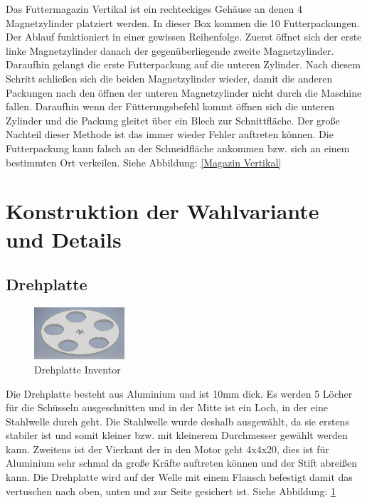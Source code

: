 Das Futtermagazin Vertikal ist ein rechteckiges Gehäuse an denen 4 Magnetzylinder platziert werden. In dieser Box kommen die 10 Futterpackungen. Der Ablauf funktioniert in einer gewissen Reihenfolge. Zuerst öffnet sich der erste linke Magnetzylinder danach der gegenüberliegende zweite Magnetzylinder. Daraufhin gelangt die erste Futterpackung auf die unteren Zylinder. Nach diesem Schritt schließen sich die beiden Magnetzylinder wieder, damit die anderen Packungen nach den öffnen der unteren Magnetzylinder nicht durch die Maschine fallen. Daraufhin wenn der Fütterungsbefehl kommt öffnen sich die unteren Zylinder und die Packung gleitet über ein Blech zur Schnittfläche. Der große Nachteil dieser Methode ist das immer wieder Fehler auftreten können. Die Futterpackung kann falsch an der Schneidfläche ankommen bzw. sich an einem bestimmten Ort verkeilen. Siehe Abbildung: \ref{Magazin Vertikal}


\section{Konstruktion der Wahlvariante und Details}

\subsection{Drehplatte}

\begin{figure}
\vspace{-20pt}
  \begin{center}
    \includegraphics[width=0.30\textwidth]{Bilder/Inventor/Drehplatte}
  \end{center}
  \caption{Drehplatte Inventor}
  \label{Drehplatte_Inventor}
  \vspace{-10pt}
\end{figure}

Die Drehplatte besteht aus Aluminium und ist 10mm dick. Es werden 5 Löcher für die Schüsseln ausgeschnitten und in der Mitte ist ein Loch, in der eine Stahlwelle durch geht. Die Stahlwelle wurde deshalb ausgewählt, da sie erstens stabiler ist und somit kleiner bzw. mit kleinerem Durchmesser gewählt werden kann. Zweitens ist der Vierkant der in den Motor geht 4x4x20, dies ist für Aluminium sehr schmal da große Kräfte auftreten können und der Stift abreißen kann. Die Drehplatte wird auf der Welle mit einem Flansch befestigt damit das vertuschen nach oben, unten und zur Seite gesichert ist. Siehe Abbildung: \ref{Drehplatte_Inventor} \\

